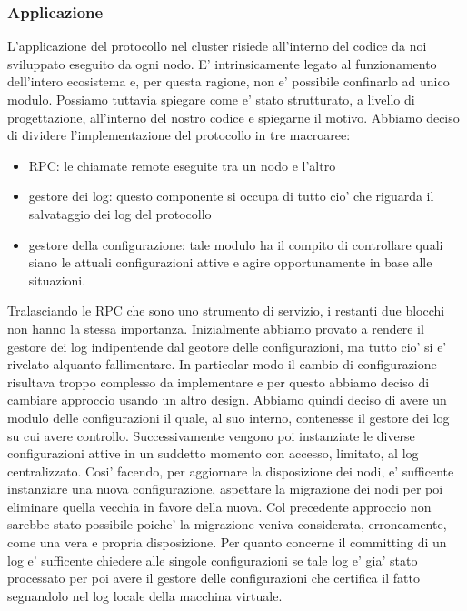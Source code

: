 \subsubsection{Applicazione}
L'applicazione del protocollo nel cluster risiede all'interno del codice da noi sviluppato
eseguito da ogni nodo. E' intrinsicamente legato al funzionamento dell'intero ecosistema e, per 
questa ragione, non e' possibile confinarlo ad unico modulo. 
Possiamo tuttavia spiegare come e' stato strutturato, a livello di progettazione, all'interno
del nostro codice e spiegarne il motivo.
Abbiamo deciso di dividere l'implementazione del protocollo in tre macroaree:
\begin{itemize}
    \item RPC: le chiamate remote eseguite tra un nodo e l'altro
    \item gestore dei log: questo componente si occupa di tutto cio' che riguarda il salvataggio 
        dei log del protocollo
    \item gestore della configurazione: tale modulo ha il compito di controllare quali siano 
        le attuali configurazioni attive e agire opportunamente in base alle situazioni.
\end{itemize}
Tralasciando le RPC che sono uno strumento di servizio, i restanti due blocchi non hanno la stessa
importanza. Inizialmente abbiamo provato a rendere il gestore dei log indipentende 
dal geotore delle configurazioni, ma tutto cio' si e' rivelato alquanto fallimentare.
In particolar modo il cambio di configurazione risultava troppo complesso da implementare 
e per questo abbiamo deciso di cambiare approccio usando un altro design. 
Abbiamo quindi deciso di avere un modulo delle configurazioni il quale, al suo interno, contenesse
il gestore dei log su cui avere controllo.
Successivamente vengono poi instanziate le diverse configurazioni attive in un suddetto momento
con accesso, limitato, al log centralizzato.
Cosi' facendo, per aggiornare la disposizione dei nodi, e' sufficente instanziare una
nuova configurazione, aspettare la migrazione dei nodi per poi eliminare quella vecchia in favore 
della nuova. Col precedente approccio non sarebbe stato possibile poiche' la migrazione veniva 
considerata, erroneamente, come una vera e propria disposizione. 
Per quanto concerne il committing di un log e' sufficente chiedere alle singole configurazioni
se tale log e' gia' stato processato per poi avere il gestore delle configurazioni che certifica
il fatto segnandolo nel log locale della macchina virtuale.

